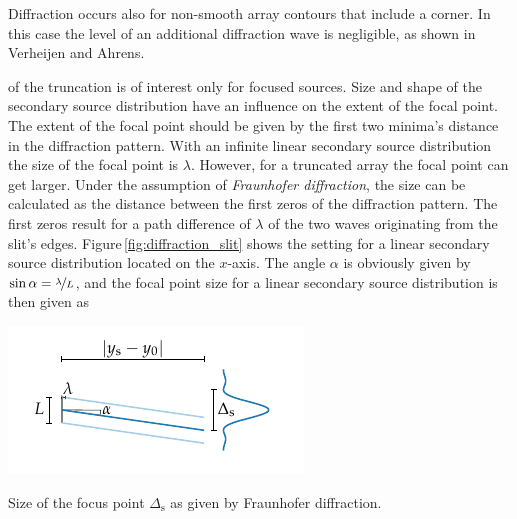 Diffraction occurs also for non-smooth array contours that include a corner. In
this case the level of an additional diffraction wave is negligible, as shown
in Verheijen\autocite[][Fig.\,2.22]{Verheijen1997} and
Ahrens\autocite[][Fig.\,3.26 and 3.27]{Ahrens2012}.

 of the truncation is of interest only for focused
sources.
Size and shape of the secondary source distribution have an influence on
the extent of the focal point. The extent of the focal point should be given by
the first two minima's distance in the diffraction pattern.
With an infinite linear secondary source distribution the size of the 
focal point is $\lambda$.
However, for a truncated array the focal point can get larger.
Under the assumption of
\emph{Fraunhofer diffraction},\autocite[][Sect.\,8.3, (34). Diffraction
for a focal point is equivalent to diffraction for plane waves coming from
infinity and focus them by a lens -- compare Figure\,8.6.
For plane waves from infinity eq.\,34 is automatically fullfilled.]{Born1999}
the size can be
calculated as the distance between the first zeros of the diffraction pattern.
The first zeros result for a path difference of $\lambda$ of the two waves
originating from the slit's edges.
Figure\,\ref{fig:diffraction_slit} shows the setting for a linear secondary
source distribution located on the $x$-axis. The angle
$\alpha$ is obviously given by $\sin\alpha =
\nicefrac{\lambda}{L}$, and the focal point size for a linear secondary source
distribution is then 
given as\autocite[][(13)]{Wierstorf2013a}
%
\begin{marginfigure}
    \centering
    \includegraphics{fig3_05/fig3_05}
    \caption{Size of the focus point $\Delta_\text{s}$ as given by Fraunhofer
    diffraction.
    }
    \label{fig:diffraction_slit}
\end{marginfigure}
